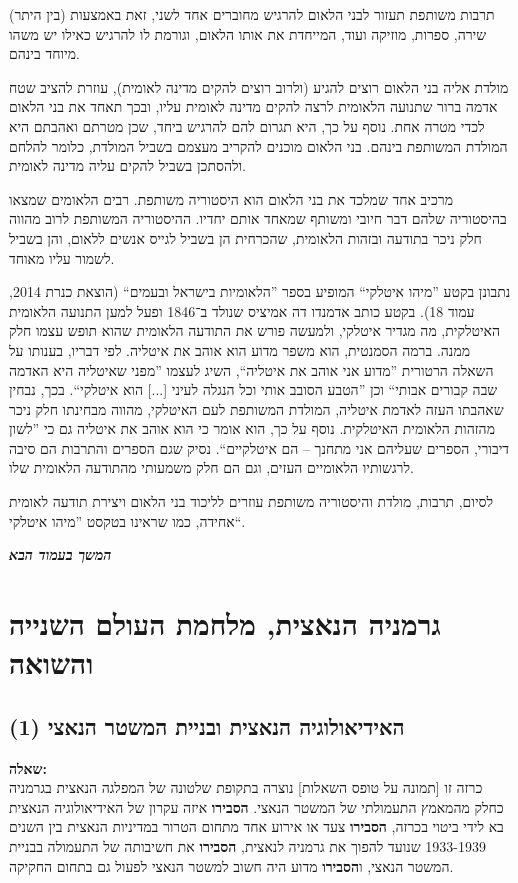 \documentclass[a4paper]{article}
\newcommand\hl[1]   {#1}
\newcommand\npage {\vfil {\hfil \textbf{\textit{המשך בעמוד הבא}}} \hfil \vfil \pagebreak}
\begin{document}
\begin{enumerate}[A.]
			\hl{תרבות משותפת} תעזור לבני הלאום להרגיש מחוברים אחד לשני, זאת באמצעות (בין היתר) שירה, ספרות, מוזיקה ועוד, המייחדת את אותו הלאום, וגורמת לו להרגיש כאילו יש משהו מיוחד בינהם. 
			
			\hl{מולדת} אליה בני הלאום רוצים להגיע (ולרוב רוצים להקים מדינה לאומית), עוזרת להציב שטח אדמה ברור שתנועה הלאומית לרצה להקים מדינה לאומית עליו, ובכך תאחד את בני הלאום לכדי מטרה אחת. נוסף על כך, היא תגרום להם להרגיש ביחד, שכן מטרתם ואהבתם היא המולדת המשותפת בינהם. בני הלאום מוכנים להקריב מעצמם בשביל המולדת, כלומר להלחם ולהסתכן בשביל להקים עליה מדינה לאומית. 
			
			מרכיב אחד שמלכד את בני הלאום הוא \hl{היסטוריה משותפת}. רבים הלאומים שמצאו בהיסטוריה שלהם דבר חיובי ומשותף שמאחד אותם יחדיו. ההיסטוריה המשותפת לרוב מהווה חלק ניכר בתודעה ובזהות הלאומית, שהכרחית הן בשביל לגייס אנשים ללאום, והן בשביל לשמור עליו מאוחד. 
			
			נתבונן בקטע ''מיהו איטלקי`` המופיע בספר ''הלאומיות בישראל ובעמים`` (הוצאת כנרת 2014, עמוד 18). בקטע כותב אדמנדו דה אמיציס שנולד ב־1846 ופעל למען התנועה הלאומית האיטלקית, מה מגדיר איטלקי, ולמעשה פורש את התודעה הלאומית שהוא תופש עצמו חלק ממנה. ברמה הסמנטית, הוא משפר מדוע הוא אוהב את איטליה. לפי דבריו, בענותו על השאלה הרטורית ''מדוע אני אוהב את איטליה``, השיג לעצמו ''מפני שאיטליה היא האדמה שבה קבורים אבותי`` וכן ''הטבע הסובב אותי וכל הנגלה לעיני [...] הוא איטלקי``. בכך, נבחין שאהבתו העזה לאדמת איטליה, המולדת המשותפת לעם האיטלקי, מהווה מבחינתו חלק ניכר מהזהות הלאומית האיטלקית. נוסף על כך, הוא אומר כי הוא אוהב את איטליה גם כי ''לשון דיבורי, הספרים שעליהם אני מתחנך – הם איטלקיים``. נסיק שגם הספרים והתרבות הם סיבה לרגשותיו הלאומיים העזים, וגם הם חלק משמעותי מהתודעה הלאומית שלו. 
			
			לסיום, תרבות, מולדת והיסטוריה משותפת עוזרים לליכוד בני הלאום ויצירת תודעה לאומית אחידה, כמו שראינו בטקסט ''מיהו איטלקי``. 
			
		\end{enumerate}
		
	
	\npage
	
	\section{גרמניה הנאצית, מלחמת העולם השנייה והשואה}
	\subsection{האידיאולוגיה הנאצית ובניית המשטר הנאצי (1)}
	\textbf{שאלה: }\\
	כרזה זו [תמונה על טופס השאלות] נוצרה בתקופת שלטונה של המפלגה הנאצית בגרמניה כחלק מהמאמץ התעמולתי של המשטר הנאצי. \textbf{הסבירו} איזה עקרון של האידיאולוגיה הנאצית בא לידי ביטוי בכרזה, \textbf{הסבירו} צעד או אירוע אחד מתחום הטרור במדיניות הנאצית בין השנים 1933-1939 שנועד להפוך את גרמניה לנאצית, \textbf{הסבירו} את חשיבותה של התעמולה בבניית המשטר הנאצי, ו\textbf{הסבירו} מדוע היה חשוב למשטר הנאצי לפעול גם בתחום החקיקה. 
	
\end{document}
